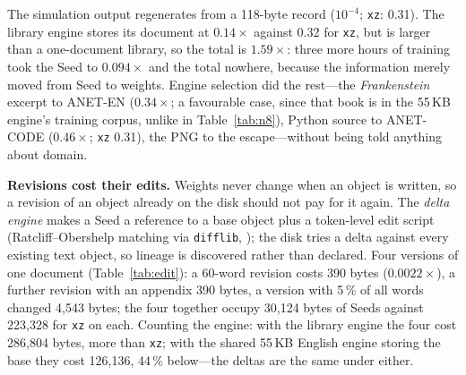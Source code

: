 \documentclass[11pt,a4paper]{article}
\theoremstyle{definition}
\theoremstyle{plain}
\theoremstyle{remark}
\begin{document}
\begin{table}[!htb]
\centering\small
\caption{One disk, four engines. ``ratio'' is Seed/size with engines shared; ``total'' adds the
chosen engine's bytes, the number for a single-object disk. All bit-exact.}
\label{tab:multi}
{\scriptsize\setlength{\tabcolsep}{2.5pt}\multiTable{}}
\end{table}

The simulation output regenerates from a 118-byte record ($10^{-4}$; \texttt{xz}: 0.31). The
library engine stores its document at $0.14\times$ against 0.32 for \texttt{xz}, but is larger than
a one-document library, so the total is $1.59\times$: three more hours of training took the Seed to
$0.094\times$ and the total nowhere, because the information merely moved from Seed to weights.
Engine selection did the rest---the \emph{Frankenstein} excerpt to ANET-EN ($0.34\times$; a
favourable case, since that book is in the 55\,KB engine's training corpus, unlike in
Table~\ref{tab:n8}), Python source to ANET-CODE ($0.46\times$; \texttt{xz} 0.31), the PNG to the
escape---without being told anything about domain.

\textbf{Revisions cost their edits.} Weights never change when an object is written, so a
revision of an object already on the disk should not pay for it again. The \emph{delta engine}
makes a Seed a reference to a base object plus a token-level edit script (Ratcliff--Obershelp
matching via \texttt{difflib}, \citealp{ratcliff1988}); the disk tries a delta against every
existing text object, so lineage is discovered rather than declared. Four versions of one
document (Table~\ref{tab:edit}): a 60-word revision costs 390 bytes ($0.0022\times$), a further
revision with an appendix 390 bytes, a version with 5\,\% of all words changed 4,543 bytes;
the four together occupy 30,124 bytes of Seeds against 223,328 for \texttt{xz} on each. Counting
the engine: with the library engine the four cost 286,804 bytes, more than \texttt{xz}; with the
shared 55\,KB English engine storing the base they cost 126,136, 44\,\% below---the deltas are the
same under either.

\begin{table}[!htb]
\centering\small
\caption{Four versions of one document. Each was written with the library engine and, where
smaller, as a delta against the best existing base. All bit-exact. Read times here were measured
while a training job shared the machine's single core; Table~\ref{tab:multi} has the same
engine and object unloaded (12\,s).}
\label{tab:edit}
{\footnotesize\setlength{\tabcolsep}{2.8pt}\editTable{}}
\end{table}
\end{document}
